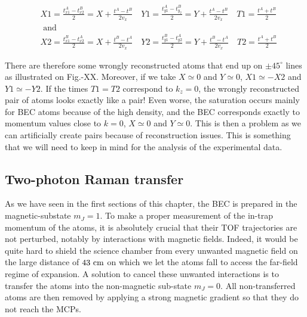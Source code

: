 \begin{equation}
\begin{aligned}
&X 1=\frac{t_{x 1}^{A}-t_{x 2}^{B}}{2}=X+\frac{t^{A}-t^{B}}{2 v_{x}} \quad Y 1=\frac{t_{y 1}^{A}-t_{y_{2}}^{B}}{2}=Y+\frac{t^{A}-t^{B}}{2 v_{x}} \quad T 1=\frac{t^{A}+t^{B}}{2}\\
&\text { and }\\
&X 2=\frac{t_{x 1}^{B}-t_{x 2}^{A}}{2}=X+\frac{t^{B}-t^{A}}{2 v_{x}} \quad Y 2=\frac{t_{y 1}^{B}-t_{y 2}^{A}}{2}=Y+\frac{t^{B}-t^{A}}{2 v_{x}} \quad T 2=\frac{t^{A}+t^{B}}{2}
\end{aligned}
\end{equation}

There are therefore some wrongly reconstructed atoms that end up on $\pm 45^{\circ}$ lines as illustrated on Fig.-XX. Moreover, if we take $X \simeq 0$ and $Y \simeq 0$, $X1 \simeq -X2$ and $Y1 \simeq -Y2$. If the times $T1=T2$ correspond to $k_z=0$, the wrongly reconstructed pair of atoms looks exactly like a \kmk pair! Even worse, the saturation occurs mainly for BEC atoms because of the high density, and the BEC corresponds exactly to momentum values close to $k=0$, \ie  $X \simeq 0$ and $Y \simeq 0$. This is then a problem as we can artificially create \kmk pairs because of reconstruction issues. This is something that we will need to keep in mind for the analysis of the experimental data.


\subsection{Two-photon Raman transfer}

\label{sec:raman}

As we have seen in the first sections of this chapter, the BEC is prepared in the magnetic-substate $m_J=1$. To make a proper measurement of the in-trap momentum of the atoms, it is absolutely crucial that their TOF trajectories are not perturbed, notably by interactions with magnetic fields. Indeed, it would be quite hard to shield the science chamber from every unwanted magnetic field on the large distance of $43 \ \rm{cm}$ on which we let the atoms fall to access the far-field regime of expansion. A solution to cancel these unwanted interactions is to transfer the atoms into the non-magnetic sub-state $m_J=0$. All non-transferred atoms are then removed by applying a strong magnetic gradient so that they do not reach the MCPs.

